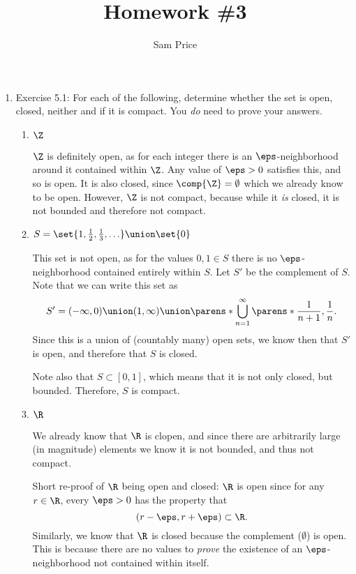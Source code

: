 \documentclass{article}
\author{Sam Price}
\date{}
\title{Homework \#3}
\begin{document}
\maketitle

\begin{enumerate}

    \item Exercise 5.1: For each of the following, determine whether the set is open, closed, neither and if it is compact.
        You \emph{do} need to prove your answers.
        \begin{enumerate}
          \item $\Z$

                $\Z$ is definitely open, as for each integer there is an $\eps$-neighborhood around it contained within $\Z$.
                Any value of $\eps > 0$ satisfies this, and so is open.
                It is also closed, since $\comp{\Z} = \emptyset$ which we already know to be open. However, $\Z$ is not compact, because while it
                \emph{is} closed, it is not bounded and therefore not compact.

          \item $S = \set{1, \frac{1}{2}, \frac{1}{3}, \ldots} \union \set{0}$

                This set is not open, as for the values $0, 1 \in S$ there is no $\eps$-neighborhood contained entirely within $S$.
                Let $S'$ be the complement of $S$. Note that we can write this set as
                \[ S' = (-\infty, 0) \union (1, \infty) \union \parens*{\bigcup_{n = 1}^{\infty}\parens*{\frac{1}{n + 1}, \frac{1}{n}}}. \]
                Since this is a union of (countably many) open sets, we know then that $S'$ is open, and therefore that $S$ is closed.

                Note also that $S \subset [0, 1]$, which means that it is not only closed, but bounded. Therefore, $S$ is compact.

          \item $\R$

                We already know that $\R$ is clopen, and since there are arbitrarily large (in magnitude) elements we know it is not bounded,
                and thus not compact.

                Short re-proof of $\R$ being open and closed: $\R$ is open since for any $r \in \R$, every $\eps > 0$ has the property that
                \[ (r - \eps, r + \eps) \subset \R. \]
                Similarly, we know that $\R$ is closed because the complement ($\emptyset$) is open. This is because there are no values to
                \emph{prove} the existence of an $\eps$-neighborhood not contained within itself.


\end{enumerate}
\end{enumerate}
\end{document}
